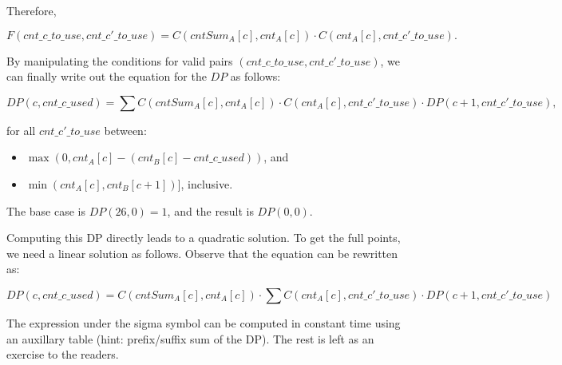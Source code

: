 Therefore,

$$F(cnt\_c\_to\_use, cnt\_c'\_to\_use) = C(cntSum_{A}[c], cnt_{A}[c]) \cdot C(cnt_{A}[c],cnt\_c'\_to\_use).$$

By manipulating the conditions for valid pairs $(cnt\_c\_to\_use, cnt\_c'\_to\_use)$, we can finally write out the equation for the $DP$ as follows:

$$DP(c, cnt\_c\_used) = \sum C(cntSum_{A}[c], cnt_{A}[c]) \cdot C(cnt_{A}[c],cnt\_c'\_to\_use) \cdot DP(c+1, cnt\_c'\_to\_use),$$

for all $cnt\_c'\_to\_use$ between:

\begin{itemize}
  \item $\max(0, cnt_{A}[c] - (cnt_{B}[c]-cnt\_c\_used))$, and
  \item $\min(cnt_{A}[c], cnt_{B}[c+1])]$, inclusive.
\end{itemize}

The base case is $DP(26, 0) = 1$, and the result is $DP(0, 0)$.

Computing this DP directly leads to a quadratic solution. To get the full points, we need a linear solution as follows. Observe that the equation can be rewritten as:

$$DP(c, cnt\_c\_used) = C(cntSum_{A}[c], cnt_{A}[c]) \cdot \sum  C(cnt_{A}[c],cnt\_c'\_to\_use) \cdot DP(c+1, cnt\_c'\_to\_use)$$

The expression under the sigma symbol can be computed in constant time using an auxillary table (hint: prefix/suffix sum of the DP). The rest is left as an exercise to the readers.
